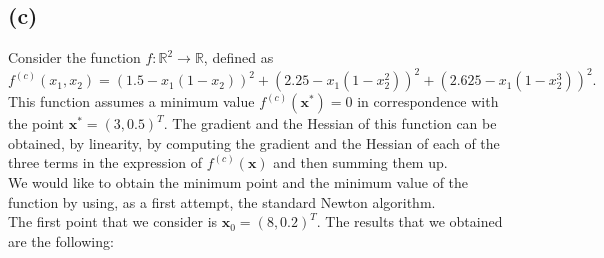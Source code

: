 \documentclass[a4paper,11pt]{article}
\begin{document}
	\subsection{(c)}
	Consider the function $f:\mathbb{R}^{2} \rightarrow  \mathbb{R}$, defined as 
	\begin{equation}
		f^{(c)}(x_{1},x_{2}) = (1.5 - x_{1}(1-x_{2}))^2 + (2.25 - x_{1}(1-x_{2}^{2}))^2 + (2.625 - x_{1}(1-x_{2}^{3}))^2.
	\end{equation}
	This function assumes a minimum value $f^{(c)}(\textbf{x}^*)=0$ in correspondence with the point $\textbf{x}^* = (3,0.5)^{T}$. The gradient and the Hessian of this function can be obtained, by linearity, by computing the gradient and the Hessian of each of the three terms in the expression of $f^{(c)}(\textbf{x})$ and then summing them up.\\
	
	\noindent We would like to obtain the minimum point and the minimum value of the function by using, as a first attempt, the standard Newton algorithm.\\
	
	 
	\noindent The first point that we consider is $\textbf{x}_{0}=(8,0.2)^{T}$. The results that we obtained are the following:
	
\end{document}
